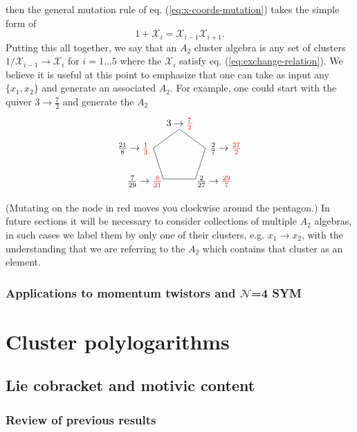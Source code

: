 \documentclass[11pt]{article}
\def\x{\mathcal{X}}
\def\pdfeq#1{\texorpdfstring{$#1$}{a}}
\def\drawPentagon{
\coordinate (P1) at (90:1);
\coordinate (P2) at (18:1);
\coordinate (P3) at (306:1);
\coordinate (P4) at (234:1);
\coordinate (P5) at (162:1);
\draw (P1) -- (P2) -- (P3) -- (P4) -- (P5) -- cycle;
}
\begin{document}
then the general mutation rule of eq. (\ref{eq:x-coords-mutation}) takes the simple form of
\begin{equation}\label{eq:exchange-relation}
  1+\x_i = \x_{i-1}\x_{i+1}.
\end{equation}
Putting this all together, we say that an $A_2$ cluster algebra is any set of clusters $1/\x_{i-1} \to \x_i$ for $i=1\ldots5$ where the $\x_i$ satisfy eq. (\ref{eq:exchange-relation}). We believe it is useful at this point to emphasize that one can take as input any $\{x_1, x_2\}$ and generate an associated $A_2$. For example, one could start with the quiver $3\to\frac{7}{2}$ and generate the $A_2$
\begin{equation}
\begin{tikzpicture}
  \drawPentagon
  \draw (0,1.2) node {$3\to\color{red}{\frac{7}{2}}$};
  \draw (1,.3) node[anchor=west] {$\frac{2}{7} \to \color{red}{\frac{27}{2}} $};
  \draw (.5,-.9) node[anchor=west] {$\frac{2}{27} \to \color{red}{\frac{29}{7}}$};
  \draw (-.5,-.9) node[anchor=east] {$\frac{7}{29} \to \color{red}{\frac{8}{21}}$};
  \draw (-1,.3) node[anchor=east] {$\frac{21}{8} \to \color{red}{\frac{1}{3}}$};
\end{tikzpicture}
\end{equation}
(Mutating on the node in red moves you clockwise around the pentagon.) In future sections it will be necessary to consider collections of multiple $A_2$ algebras, in such cases we label them by only one of their clusters, e.g. $x_1 \to x_2$, with the understanding that we are referring to the $A_2$ which contains that cluster as an element. 

\subsubsection{Applications to momentum twistors and \pdfeq{\mathcal{N}}=4 SYM}

\section{Cluster polylogarithms}
\subsection{Lie cobracket and motivic content}
\subsubsection{Review of previous results}
\end{document}
